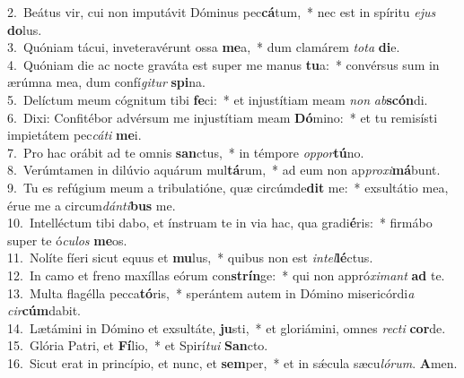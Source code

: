{2.~}Beátus vir, cui non imputávit Dóminus pec\textbf{cá}tum,~* nec est in spíritu \textit{e}\textit{jus} \textbf{do}lus.\\
{3.~}Quóniam tácui, inveteravérunt ossa \textbf{me}a,~* dum clamárem \textit{to}\textit{ta} \textbf{di}e.\\
{4.~}Quóniam die ac nocte graváta est super me manus \textbf{tu}a:~* convérsus sum in ærúmna mea, dum confí\textit{gi}\textit{tur} \textbf{spi}na.\\
{5.~}Delíctum meum cógnitum tibi \textbf{fe}ci:~* et injustítiam meam \textit{non} \textit{ab}\textbf{scón}di.\\
{6.~}Dixi: Confitébor advérsum me injustítiam meam \textbf{Dó}mino:~* et tu remisísti impietátem pec\textit{cá}\textit{ti} \textbf{me}i.\\
{7.~}Pro hac orábit ad te omnis \textbf{san}ctus,~* in témpore \textit{op}\textit{por}\textbf{tú}no.\\
{8.~}Verúmtamen in dilúvio aquárum mul\textbf{tá}rum,~* ad eum non ap\textit{pro}\textit{xi}\textbf{má}bunt.\\
{9.~}Tu es refúgium meum a tribulatióne, quæ circúmde\textbf{dit} me:~* exsultátio mea, érue me a circum\textit{dán}\textit{ti}\textbf{bus} me.\\
{10.~}Intelléctum tibi dabo, et ínstruam te in via hac, qua gradi\textbf{é}ris:~* firmábo super te ó\textit{cu}\textit{los} \textbf{me}os.\\
{11.~}Nolíte fíeri sicut equus et \textbf{mu}lus,~* quibus non est \textit{in}\textit{tel}\textbf{lé}ctus.\\
{12.~}In camo et freno maxíllas eórum con\textbf{strín}ge:~* qui non appró\textit{xi}\textit{mant} \textbf{ad} te.\\
{13.~}Multa flagélla pecca\textbf{tó}ris,~* sperántem autem in Dómino misericórdi\textit{a} \textit{cir}\textbf{cúm}dabit.\\
{14.~}Lætámini in Dómino et exsultáte, \textbf{ju}sti,~* et gloriámini, omnes \textit{re}\textit{cti} \textbf{cor}de.\\
{15.~}Glória Patri, et \textbf{Fí}lio,~* et Spirí\textit{tu}\textit{i} \textbf{San}cto.\\
{16.~}Sicut erat in princípio, et nunc, et \textbf{sem}per,~* et in sǽcula sæcu\textit{ló}\textit{rum}. \textbf{A}men.\\
